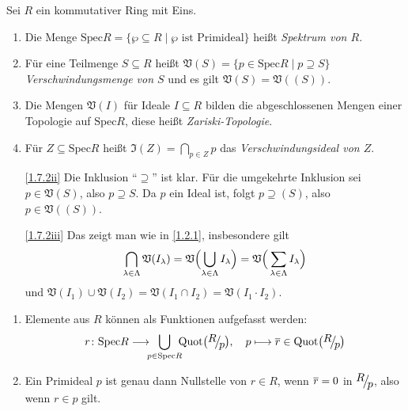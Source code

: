 \documentclass[a4paper,12pt]{scrbook}
\makeatletter
\theoremstyle{blah}
\theoremstyle{stz}
\renewcommand{\proofname}{Beweis}
\renewenvironment{proof}[1][\proofname]{\par
  \pushQED{\qed}%
  \normalfont \topsep6\p@\@plus6\p@\relax
  \trivlist
  \item[\hskip\labelsep
        \itshape
    #1\@addpunct{:}]\ignorespaces
}{%
  \popQED\endtrivlist\@endpefalse
}
\def\V{\mathfrak{V}}
\def\I{\mathfrak{I}}
\newcommand{\Spec}{\mathrm{Spec}}
\newcommand{\ra}{\longrightarrow}
\newcommand{\Quot}{\mathrm{Quot}}
\renewcommand{\mapsto}{\longmapsto}
\def\Bar#1{\ensuremath\overline{#1}}
\newcommand{\Quotient}[2]{
  \raisebox{0.7ex}{\ensuremath{#1}}
  \ensuremath{\mkern-3mu}\big/\ensuremath{\mkern-3mu}
  \raisebox{-0.6ex}{\ensuremath{#2}}}
\makeatother
\begin{document}
\begin{db}\label{1.7.2}
  Sei $R$ ein kommutativer Ring mit Eins.
  \begin{enumerate}
  \item\label{1.7.2i} Die Menge $\Spec R = \{\wp\subseteq R \mid \wp\text{ ist Primideal}\}$ heißt \emph{Spektrum von $R$}.
  \item\label{1.7.2ii} Für eine Teilmenge $S\subseteq R$ heißt $\V(S) = \{p\in\Spec R \mid p\supseteq S\}$
    \emph{Verschwindungsmenge von $S$} und es gilt $\V(S)=\V((S))$.
  \item\label{1.7.2iii} Die Mengen $\V(I)$ für Ideale $I\subseteq R$ bilden die abgeschlossenen Mengen einer Topologie auf
    $\Spec R$, diese heißt \emph{Zariski-Topologie}.
  \item\label{1.7.2iv} Für $Z\subseteq\Spec R$ heißt $\I(Z)=\displaystyle\bigcap_{p\in Z}p$ das \emph{Verschwindungsideal von
      $Z$}.
  \end{enumerate}
\end{db}
\begin{proof}
  \begin{enumerate}
  \item[\ref{1.7.2ii}] Die Inklusion \enquote{$\supseteq$} ist klar. Für die umgekehrte Inklusion sei $p\in\V(S)$, also
    $p\supseteq S$. Da $p$ ein Ideal ist, folgt $p\supseteq (S)$, also $p\in\V((S))$.
  \item[\ref{1.7.2iii}] Das zeigt man wie in \autoref{1.2.1}, insbesondere gilt
    \[\displaystyle\bigcap_{\lambda\in\Lambda}\V(I_\lambda) =
    \V\Bigl(\bigcup_{\lambda\in\Lambda}I_\lambda\Bigr)=\V\Bigr(\sum_{\lambda\in\Lambda}I_\lambda\Bigr)\] und
    $\V(I_1)\cup\V(I_2)=\V(I_1\cap I_2)=\V(I_1\cdot I_2)$.
  \end{enumerate}
\end{proof}

\begin{db}\label{1.7.3}
  \begin{enumerate}
  \item\label{1.7.3i} Elemente aus $R$ können als Funktionen aufgefasst werden:
    \[ r\colon \Spec R \ra \!\!\!\bigcup_{p\in\Spec R}\!\!\! \Quot\bigl(\Quotient{R}{p}\bigr),\quad
    p\mapsto\Bar{r}\in\Quot\bigl(\Quotient{R}{p}\bigr) \]
  \item\label{1.7.3ii} Ein Primideal $p$ ist genau dann Nullstelle von $r\in R$, wenn $\Bar{r}=0$ in $\Quotient{R}{p}$, also wenn
    $r\in p$ gilt.
  \end{enumerate}
\end{db}
\end{document}
